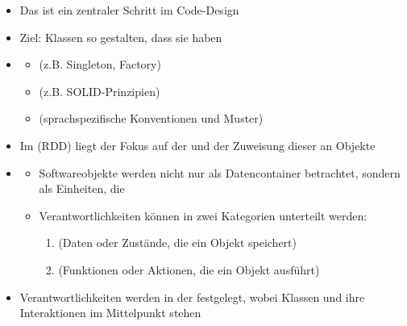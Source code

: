 \begin{infoBox}[title=Zuweisung von Verantwortlichkeiten]
    \begin{itemize}
        \item Das  ist ein zentraler Schritt im Code-Design
        \item Ziel: Klassen so gestalten, dass sie  haben
        \item {}
        \begin{itemize}
            \item {} (z.B. Singleton, Factory)
            \item {} (z.B. SOLID-Prinzipien)
            \item {} (sprachspezifische Konventionen und Muster)
        \end{itemize}
    \end{itemize}
\end{infoBox}
\begin{infoBox}[title=Responsibility-Driven Design (RDD)]
    \begin{itemize}
        \item Im  (RDD) liegt der Fokus auf der  und der Zuweisung dieser an Objekte
        \item {}
        \begin{itemize}
            \item Softwareobjekte werden nicht nur als Datencontainer betrachtet, sondern als Einheiten, die 
            \item Verantwortlichkeiten können in zwei Kategorien unterteilt werden:
            \begin{enumerate}
                \item {} (Daten oder Zustände, die ein Objekt speichert)
                \item {} (Funktionen oder Aktionen, die ein Objekt ausführt)
            \end{enumerate}
        \end{itemize}
        \item Verantwortlichkeiten werden in der  festgelegt, wobei Klassen und ihre Interaktionen im Mittelpunkt stehen
    \end{itemize}
\end{infoBox}
